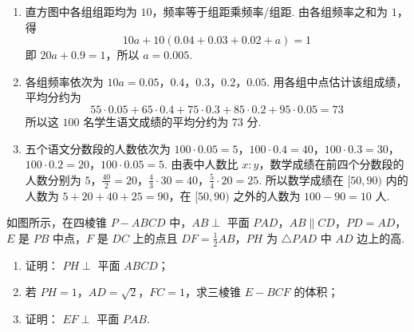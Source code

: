 \begin{solution}
\begin{enumerate}
\item 直方图中各组组距均为 \(10\)，频率等于组距乘频率/组距. 由各组频率之和为 \(1\)，得
\[
10a+10(0.04+0.03+0.02+a)=1
\]
即 \(20a+0.9=1\)，所以 \(a=0.005\).
\item 各组频率依次为
\(10a=0.05\)，\(0.4\)，\(0.3\)，\(0.2\)，\(0.05\).
用各组中点估计该组成绩，平均分约为
\[
55\cdot0.05+65\cdot0.4+75\cdot0.3+85\cdot0.2+95\cdot0.05=73
\]
所以这 \(100\) 名学生语文成绩的平均分约为 \(73\) 分.
\item 五个语文分数段的人数依次为
\(100\cdot0.05=5\)，\(100\cdot0.4=40\)，\(100\cdot0.3=30\)，\(100\cdot0.2=20\)，\(100\cdot0.05=5\).
由表中人数比 \(x:y\)，数学成绩在前四个分数段的人数分别为
\(5\)，\(\frac{40}{2}=20\)，\(\frac{4}{3}\cdot30=40\)，\(\frac{5}{4}\cdot20=25\).
所以数学成绩在 \([50,90)\) 内的人数为 \(5+20+40+25=90\)，在 \([50,90)\) 之外的人数为 \(100-90=10\) 人.
\end{enumerate}
\end{solution}

\begin{problem}
如图所示，在四棱锥 \(P - ABCD\) 中，\(AB \perp\) 平面 \(PAD\)，\(AB \parallel CD\)，\(PD = AD\)，\(E\) 是 \(PB\) 中点，\(F\) 是 \(DC\) 上的点且 \(DF = \frac{1}{2} AB\)，\(PH\) 为 \(\triangle PAD\) 中 \(AD\) 边上的高.
\begin{enumerate}
\item 证明： \(PH \perp\) 平面 \(ABCD\)；
\item 若 \(PH = 1\)，\(AD = \sqrt{2}\)，\(FC = 1\)，求三棱锥 \(E - BCF\) 的体积；
\item 证明： \(EF \perp\) 平面 \(PAB\).
\end{enumerate}

\end{problem}

